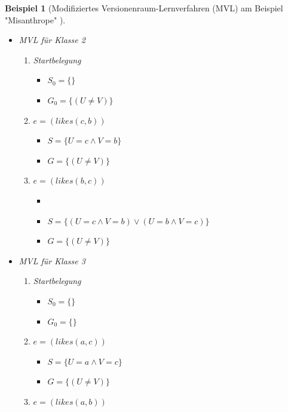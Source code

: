 \documentclass[a4paper, 11pt]{book}
\newtheorem{Bsp}{Beispiel}[section]
\begin{document}
{\begin{Bsp}[Modifiziertes Versionenraum-Lernverfahren (MVL) am Beispiel "{}Misanthrope"{} ]
\begin{itemize}
\begin{enumerate}
\begin{itemize}
			\item $ G = \{(U \neq V)\} $
		\end{itemize}
		\item $ e = (likes(c,c)) $
		\begin{itemize}
		    \item $ S = \{((U = a \land V = a) \lor (U = b \land V = b)) \lor (U = c \land V = c)\}$ 
			\item $ G = \{U = V\} $
		\end{itemize}	
	\end{enumerate}
	\item MVL für Klasse 2
	\begin{enumerate}
		\item Startbelegung
		\begin{itemize}
			\item $ S_0 = \{\}$ 
			\item $ G_0 = \{(U \neq V)\} $
		\end{itemize}
		\item $ e = (likes(c,b)) $
		\begin{itemize}
			\item $ S = \{U = c \land V = b\}$ 
			\item $ G = \{(U \neq V)\} $
		\end{itemize}
		\item $ e = (likes(b,c)) $
		\begin{itemize}
			\item \item $ S = \{(U = c \land V = b) \lor (U = b \land V = c)\}$ 
			\item $ G = \{(U \neq V)\} $
		\end{itemize}
		\end{enumerate}
	\item MVL für Klasse 3
	\begin{enumerate}
		\item Startbelegung
		\begin{itemize}
			\item $ S_0 = \{\}$ 
			\item $ G_0 = \{\} $
		\end{itemize}
		\item $ e = (likes(a,c)) $
		\begin{itemize}
			\item $ S = \{U = a \land V = c\}$ 
			\item $ G = \{(U \neq V)\} $
		\end{itemize}
		\item $ e = (likes(a,b)) $

\end{enumerate}
\end{itemize}
\end{Bsp}}
\end{document}
